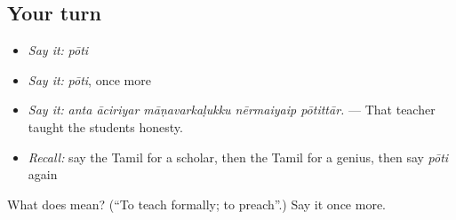 \subsection*{Your turn}
\begin{itemize}
\raggedright
  \item \emph{Say it:} \emph{pōti}
  \item \emph{Say it:} \emph{pōti}, once more
  \item \emph{Say it:} \emph{anta āciriyar māṇavarkaḷukku nērmaiyaip pōtittār.} — That teacher taught the students honesty.
  \item \emph{Recall:} say the Tamil for a scholar, then the Tamil for a genius, then say \emph{pōti} again
\end{itemize}

\begin{tcolorbox}[breakable,colback=teal!4,colframe=teal!35!black,title={Before you move on}]
What does  mean? (\textquotedblleft{}To teach formally; to preach\textquotedblright{}.) Say it once more.
\end{tcolorbox}
